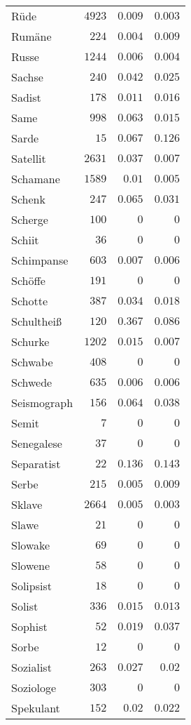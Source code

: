 \begin{supertabular}{lrrr}
Rüde & $4923$ & $0.009$ & $0.003$ \\
Rumäne & $224$ & $0.004$ & $0.009$ \\
Russe & $1244$ & $0.006$ & $0.004$ \\
Sachse & $240$ & $0.042$ & $0.025$ \\
Sadist & $178$ & $0.011$ & $0.016$ \\
Same & $998$ & $0.063$ & $0.015$ \\
Sarde & $15$ & $0.067$ & $0.126$ \\
Satellit & $2631$ & $0.037$ & $0.007$ \\
Schamane & $1589$ & $0.01$ & $0.005$ \\
Schenk & $247$ & $0.065$ & $0.031$ \\
Scherge & $100$ & $0$ & $0$ \\
Schiit & $36$ & $0$ & $0$ \\
Schimpanse & $603$ & $0.007$ & $0.006$ \\
Schöffe & $191$ & $0$ & $0$ \\
Schotte & $387$ & $0.034$ & $0.018$ \\
Schultheiß & $120$ & $0.367$ & $0.086$ \\
Schurke & $1202$ & $0.015$ & $0.007$ \\
Schwabe & $408$ & $0$ & $0$ \\
Schwede & $635$ & $0.006$ & $0.006$ \\
Seismograph & $156$ & $0.064$ & $0.038$ \\
Semit & $7$ & $0$ & $0$ \\
Senegalese & $37$ & $0$ & $0$ \\
Separatist & $22$ & $0.136$ & $0.143$ \\
Serbe & $215$ & $0.005$ & $0.009$ \\
Sklave & $2664$ & $0.005$ & $0.003$ \\
Slawe & $21$ & $0$ & $0$ \\
Slowake & $69$ & $0$ & $0$ \\
Slowene & $58$ & $0$ & $0$ \\
Solipsist & $18$ & $0$ & $0$ \\
Solist & $336$ & $0.015$ & $0.013$ \\
Sophist & $52$ & $0.019$ & $0.037$ \\
Sorbe & $12$ & $0$ & $0$ \\
Sozialist & $263$ & $0.027$ & $0.02$ \\
Soziologe & $303$ & $0$ & $0$ \\
Spekulant & $152$ & $0.02$ & $0.022$ \\

\end{supertabular}

